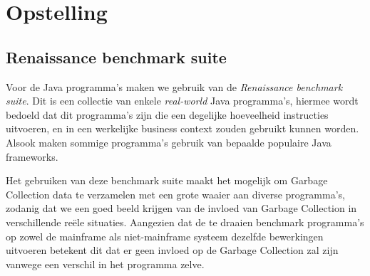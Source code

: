 
\chapter{}%
\label{ch:methodologie}







\chapter{Opstelling}
\label{ch:opstelling}
\section{Renaissance benchmark suite}
Voor de Java programma's maken we gebruik van de \textit{Renaissance benchmark suite}.
Dit is een collectie van enkele \textit{real-world} Java programma's, hiermee wordt bedoeld dat dit programma's zijn die een degelijke hoeveelheid instructies uitvoeren, en in een werkelijke business context zouden gebruikt kunnen worden. 
Alsook maken sommige programma's gebruik van bepaalde populaire Java frameworks.


Het gebruiken van deze benchmark suite maakt het mogelijk om Garbage Collection data te verzamelen met een grote waaier aan diverse programma's, zodanig dat we een goed beeld krijgen van de invloed van Garbage Collection in verschillende reële situaties.
Aangezien dat de te draaien benchmark programma's op zowel de mainframe als niet-mainframe systeem dezelfde bewerkingen uitvoeren betekent dit dat er geen invloed op de Garbage Collection zal zijn vanwege een verschil in het programma zelve.



